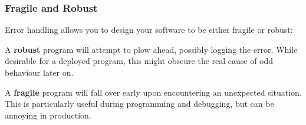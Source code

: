 \begin{frame}
    \frametitle{Fragile and Robust}
    Error handling allows you to design your software to be either fragile or robust:

    A \textbf{robust} program will attempt to plow ahead, possibly logging the error. 
    While desirable for a deployed program, this might obscure the real cause of odd behaviour later on.

    A \textbf{fragile} program will fall over early upon encountering an unexpected situation. 
    This is particularly useful during programming and debugging, but can be annoying in production.
\end{frame}
